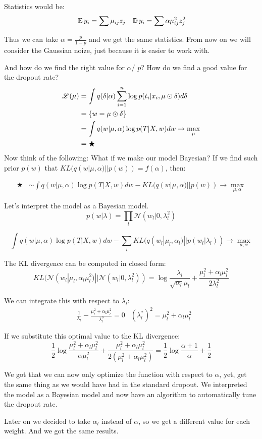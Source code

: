 Statistics would be: 
\begin{align*}
    &\operatorname{\mathbb{E}} y_i = \sum \mu_{ij} z_j
    &\operatorname{\mathbb{D}} y_i = \sum \alpha \mu_{ij}^2 z_j^2
\end{align*} 

Thus we can take $\alpha = \frac{p}{1 - p}$ and we get the same statistics. From now on we will consider the Gaussian noize, just because it is easier to work with.

And how do we find the right value for $\alpha$/ $p$? How do we find a good value for the dropout rate?
\begin{align*}
    \operatorname{\mathscr{L}} (\mu) &= \int q(\delta | \alpha) \sum_{i = 1}^n \log p(t_i | x_i, \mu \odot \delta) d \delta \\ 
    &= \{ w = \mu \odot \delta \} \\
    &= \int q(w | \mu, \alpha) \log p(T | X, w) d w \to \max_{\mu} \\ 
    &= \bigstar  
\end{align*}
Now think of the following: What if we make our model Bayesian? If we find such prior $p(w)$ that $KL(q(w | \mu, \alpha) || p(w)) = f(\alpha)$, then: 

\begin{align*}
    \bigstar &\sim \int q(w | \mu, \alpha) \log p(T | X, w) d w - KL(q(w | \mu, \alpha) || p(w)) \to \max_{\mu, \alpha} 
\end{align*}

Let's interpret the model as a Bayesian model. 
\[ 
    p(w | \lambda) = \prod_{l} \mathcal{N} (w_l | 0, \lambda_l^{2})
\] 

\[ 
    \int q(w | \mu, \alpha) \log p(T | X, w) d w - \sum_l KL (q(w_l | \mu_l, \alpha_l) || p(w_l | \lambda_l)) \to \max_{\mu, \alpha}
\] 

The KL divergence can be computed in closed form:
\[ 
    KL(\mathcal{N} (w_l | \mu_l, \alpha_l \mu_l^2) || \mathcal{N} (w_l | 0, \lambda_l^2)) = \log \frac{\lambda_l}{\sqrt{\alpha_l} \mu_l} + \frac{\mu_l^2 + \alpha_l \mu_l^2}{2 \lambda_l^2} 
\]

We can integrate this with respect to $\lambda_l$: 
\begin{align*}
    &\frac{1}{\lambda_l} - \frac{\mu_l^2 + \alpha_l \mu_l^2}{\lambda_l^3} = 0 
    &(\lambda_l^*)^2 = \mu_l^2 + \alpha_l \mu_l^2
\end{align*}

If we substitute this optimal value to the KL divergence: 
\[
    \frac{1}{2} \log \frac{\mu_l^2 + \alpha_l \mu_l^2}{\alpha \mu_l^2} + \frac{\mu_l^2 + \alpha_l \mu_l^2}{2 (\mu_l^2 + \alpha_l \mu_l^2)} = \frac{1}{2} \log \frac{\alpha + 1}{\alpha} + \frac{1}{2}
\] 

We got that we can now only optimize the function with respect to $\alpha$, yet, get the same thing as we would have had in the standard dropout. We interpreted the model as a Bayesian model and now have an algorithm to automatically tune the dropout rate.

Later on we decided to take $\alpha_l$ instead of $\alpha$, so we get a different value for each weight. And we got the same results. 


